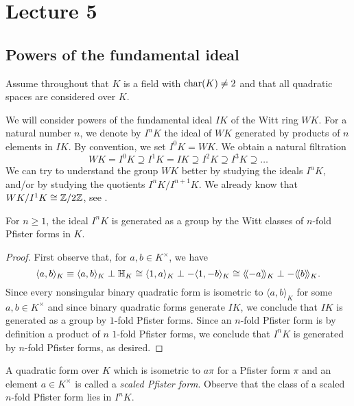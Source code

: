 \documentclass[12pt, leqno, british]{amsart}
\author{Nicolas Daans}
\begin{document}
\section{Lecture 5}

\subsection{Powers of the fundamental ideal}
Assume throughout that $K$ is a field with $\operatorname{char}(K) \neq 2$ and that all quadratic spaces are considered over $K$.

We will consider powers of the fundamental ideal $IK$ of the Witt ring $WK$. For a natural number $n$, we denote by $I^n K$ the ideal of $WK$ generated by products of $n$ elements in $IK$.
By convention, we set $I^0K = WK$.
We obtain a natural filtration
$$ WK = I^0K \supseteq I^1 K = IK \supseteq I^2 K \supseteq I^3 K \supseteq \ldots $$
We can try to understand the group $WK$ better by studying the ideals $I^n K$, and/or by studying the quotients $I^n K / I^{n+1} K$.
We already know that $WK/I^1K \cong \mathbb Z / 2\mathbb Z$, see .
\begin{prop}\label{P:generators-InK}
For $n \geq 1$, the ideal $I^n K$ is generated as a group by the Witt classes of $n$-fold Pfister forms in $K$.
\end{prop}
\begin{proof}
First observe that, for $a, b \in K^\times$, we have
$$ \langle a, b \rangle_K \equiv \langle a, b \rangle_K \perp \mathbb{H}_K \cong \langle 1, a \rangle_K \perp -\langle 1, -b \rangle_K \cong \langle\!\langle -a \rangle\!\rangle_K \perp -\langle\!\langle b \rangle\!\rangle_K.$$
Since every nonsingular binary quadratic form is isometric to $\langle a, b \rangle_K$ for some $a, b \in K^\times$ and since binary quadratic forms generate $IK$, we conclude that $IK$ is generated as a group by $1$-fold Pfister forms.
Since an $n$-fold Pfister form is by definition a product of $n$ $1$-fold Pfister forms, we conclude that $I^n K$ is generated by $n$-fold Pfister forms, as desired.
\end{proof}
A quadratic form over $K$ which is isometric to $a\pi$ for a Pfister form $\pi$ and an element $a \in K^\times$ is called a \emph{scaled Pfister form}.
Observe that the class of a scaled $n$-fold Pfister form lies in $I^nK$.
\end{document}
